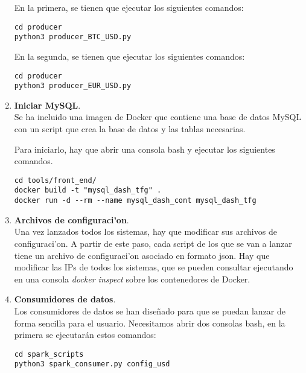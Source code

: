 \begin{enumerate}
En la primera, se tienen que ejecutar los siguientes comandos:
\begin{lstlisting}
cd producer
python3 producer_BTC_USD.py 
\end{lstlisting}

En la segunda, se tienen que ejecutar los siguientes comandos:
\begin{lstlisting}
cd producer
python3 producer_EUR_USD.py
\end{lstlisting}


\item \textbf{Iniciar MySQL}.\\
Se ha incluido una imagen de Docker que contiene una base de datos MySQL con un script que crea la base de datos y las tablas necesarias.

Para iniciarlo, hay que abrir una consola bash y ejecutar los siguientes comandos.  

\begin{lstlisting}
cd tools/front_end/
docker build -t "mysql_dash_tfg" .
docker run -d --rm --name mysql_dash_cont mysql_dash_tfg     
\end{lstlisting}

\item \textbf{Archivos de configuraci'on}.\\
Una vez lanzados todos los sistemas, hay que modificar sus archivos de configuraci'on. A partir de este paso, cada script de los que se van a lanzar tiene un archivo de configuraci'on asociado en formato json. Hay que modificar las IPs de todos los sistemas, que se pueden consultar ejecutando en una consola \textit{docker inspect} sobre los contenedores de Docker. 



\item \textbf{Consumidores de datos}.\\
Los consumidores de datos se han diseñado para que se puedan lanzar de forma sencilla para el usuario. Necesitamos abrir dos consolas bash, en la primera se ejecutarán estos comandos:

\begin{lstlisting}
cd spark_scripts
python3 spark_consumer.py config_usd   
\end{lstlisting}


\end{enumerate}
